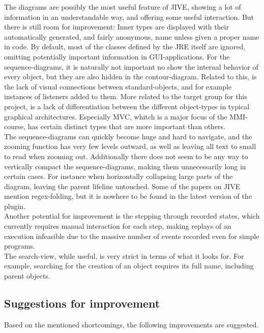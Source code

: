 The diagrams are possibly the most useful feature of JIVE, showing a lot of information in an understandable way, and offering some useful interaction.
But there is still room for improvement:
Inner types are displayed with their automatically generated, and fairly anonymous, name unless given a proper name in code.
By default, most of the classes defined by the JRE itself are ignored, omitting potentially important information in GUI-applications.
For the sequence-diagrams, it is naturally not important no show the internal behavior of every object, but they are also hidden in the contour-diagram.
Related to this, is the lack of visual connections between standard-objects, and for example instances of listeners added to them.
More related to the target group for this project, is a lack of differentiation between the different object-types in typical graphical architectures.
Especially MVC, whitch is a major focus of the MMI-course, has certain distinct types that are more important than others.
~\\

The sequence-diagrams can quickly become huge and hard to navigate, and the zooming function has very few levels outward, as well as leaving all text to small to read when zooming out.
Additionally there does not seem to be any way to vertically compact the sequence-diagrams, making them unnecessarily long in certain cases.
For instance when horizontally collapsing large parts of the diagram, leaving the parent lifeline untouched.
Some of the papers on JIVE mention regex-folding, but it is nowhere to be found in the latest version of the plugin.
~\\

Another potential for improvement is the stepping through recorded states, which currently requires manual interaction for each step, making replays of an execution infeasible due to the massive number of events recorded even for simple programs.
~\\

The search-view, while useful, is very strict in terms of what it looks for.
For example, searching for the creation of an object requires its full name, including parent objects.
~\\

\subsection{Suggestions for improvement}\label{jiveSuggestions}

Based on the mentioned shortcomings, the following improvements are suggested.
~\\

